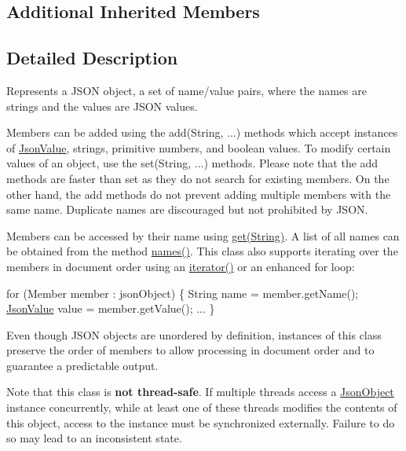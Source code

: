 \subsection*{Additional Inherited Members}


\subsection{Detailed Description}
Represents a J\+S\+ON object, a set of name/value pairs, where the names are strings and the values are J\+S\+ON values. 

Members can be added using the {\ttfamily add(String, ...)} methods which accept instances of \hyperlink{classcom_1_1ingeniigroup_1_1stratux_1_1_tools_1_1_json_micro_1_1_json_value}{Json\+Value}, strings, primitive numbers, and boolean values. To modify certain values of an object, use the {\ttfamily set(String, ...)} methods. Please note that the {\ttfamily add} methods are faster than {\ttfamily set} as they do not search for existing members. On the other hand, the {\ttfamily add} methods do not prevent adding multiple members with the same name. Duplicate names are discouraged but not prohibited by J\+S\+ON. 

Members can be accessed by their name using \hyperlink{classcom_1_1ingeniigroup_1_1stratux_1_1_tools_1_1_json_micro_1_1_json_object_a5648ce3abe042b1a434664470bedc756}{get(\+String)}. A list of all names can be obtained from the method \hyperlink{classcom_1_1ingeniigroup_1_1stratux_1_1_tools_1_1_json_micro_1_1_json_object_a70753ed3f8f6c138e16acf76874aff52}{names()}. This class also supports iterating over the members in document order using an \hyperlink{classcom_1_1ingeniigroup_1_1stratux_1_1_tools_1_1_json_micro_1_1_json_object_ae4ccfbc940cc5bac61845b666d0b4885}{iterator()} or an enhanced for loop\+: 


\begin{DoxyPre}
for (Member member : jsonObject) \{
  String name = member.getName();
  \hyperlink{classcom_1_1ingeniigroup_1_1stratux_1_1_tools_1_1_json_micro_1_1_json_value}{JsonValue} value = member.getValue();
  ...
\}
\end{DoxyPre}
 

Even though J\+S\+ON objects are unordered by definition, instances of this class preserve the order of members to allow processing in document order and to guarantee a predictable output. 

Note that this class is {\bfseries not thread-\/safe}. If multiple threads access a {\ttfamily \hyperlink{classcom_1_1ingeniigroup_1_1stratux_1_1_tools_1_1_json_micro_1_1_json_object}{Json\+Object}} instance concurrently, while at least one of these threads modifies the contents of this object, access to the instance must be synchronized externally. Failure to do so may lead to an inconsistent state. 

